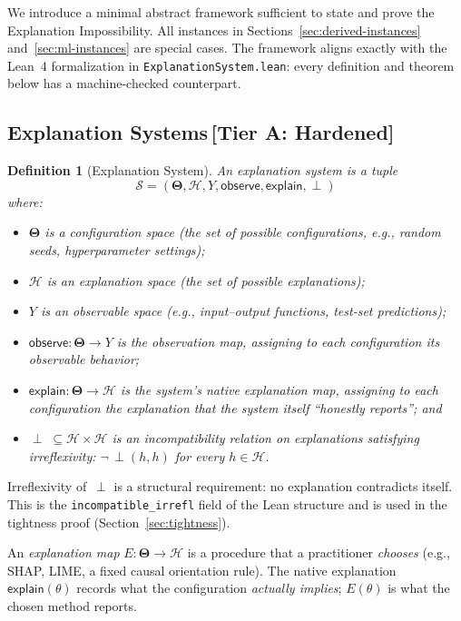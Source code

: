 \documentclass[11pt,a4paper]{article}
\newtheorem{definition}[theorem]{Definition}
\newcommand{\Params}{\mathbf{\Theta}}
\newcommand{\sH}{\mathcal{H}}
\newcommand{\incomp}{\perp}
\begin{document}
We introduce a minimal abstract framework sufficient to state and prove the
Explanation Impossibility.  All instances in
Sections~\ref{sec:derived-instances} and~\ref{sec:ml-instances} are special cases.
The framework aligns exactly with the Lean~4 formalization in
\texttt{ExplanationSystem.lean}: every definition and theorem below has a
machine-checked counterpart.

\subsection{Explanation Systems\,\textnormal{\normalsize[Tier A: Hardened]}}

\begin{definition}[Explanation System]
\label{def:explanation-system}
An \emph{explanation system} is a tuple
\[
  \mathcal{S} = (\Params, \sH, Y, \mathsf{observe}, \mathsf{explain}, \incomp)
\]
where:
\begin{itemize}
  \item $\Params$ is a \emph{configuration space} (the set of possible
    configurations, e.g., random seeds, hyperparameter settings);
  \item $\sH$ is an \emph{explanation space} (the set of possible explanations);
  \item $Y$ is an \emph{observable space} (e.g., input--output functions,
    test-set predictions);
  \item $\mathsf{observe}: \Params \to Y$ is the \emph{observation map}, assigning
    to each configuration its observable behavior;
  \item $\mathsf{explain}: \Params \to \sH$ is the system's \emph{native
    explanation map}, assigning to each configuration the explanation that the
    system itself ``honestly reports''; and
  \item $\incomp\;\subseteq \sH \times \sH$ is an \emph{incompatibility relation}
    on explanations satisfying \emph{irreflexivity}:
    $\neg\,\incomp(h, h)$ for every $h \in \sH$.
\end{itemize}
\end{definition}

Irreflexivity of~$\incomp$ is a structural requirement: no explanation
contradicts itself.  This is the \texttt{incompatible\_irrefl} field of the
Lean structure and is used in the tightness proof
(Section~\ref{sec:tightness}).

An \emph{explanation map} $E : \Params \to \sH$ is a procedure that a
practitioner \emph{chooses} (e.g., SHAP, LIME, a fixed causal orientation
rule).  The native explanation $\mathsf{explain}(\theta)$ records what the
configuration \emph{actually implies}; $E(\theta)$ is what the chosen method
reports.
\end{document}
